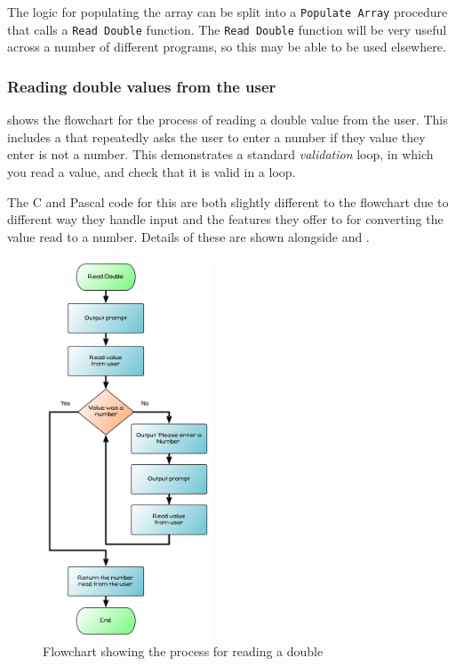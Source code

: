 The logic for populating the array can be split into a \texttt{Populate Array} procedure that calls a \texttt{Read Double} function. The \texttt{Read Double} function will be very useful across a number of different programs, so this may be able to be used elsewhere.

\subsubsection{Reading double values from the user} %
\label{ssub:reading_double_values_from_the_user}

 shows the flowchart for the process of reading a double value from the user. This includes a  that repeatedly asks the user to enter a number if they value they enter is not a number. This demonstrates a standard \emph{validation} loop, in which you read a value, and check that it is valid in a loop. 

The C and Pascal code for this are both slightly different to the flowchart due to different way they handle input and the features they offer to for converting the value read to a number. Details of these are shown alongside  and .

\begin{figure}[htbp]
   \centering
   \includegraphics[width=0.45\textwidth]{./topics/arrays/diagrams/ReadDouble} 
   \caption{Flowchart showing the process for reading a double}
   \label{fig:read-double-flow}
\end{figure}

